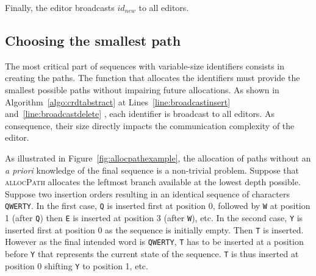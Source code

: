\noindent Finally, the editor broadcasts $id_{new}$ to all editors.


\subsection{Choosing the smallest path}
\label{subsec:choosing}

The most critical part of sequences with variable-size identifiers consists in
creating the paths. The function that allocates the identifiers must provide the
smallest possible paths without impairing future allocations. As shown in
Algorithm~\ref{algo:crdtabstract} at Lines~\ref{line:broadcastinsert}
and~\ref{line:broadcastdelete} , each identifier is broadcast to all editors. As
consequence, their size directly impacts the communication complexity of the
editor.



\begin{figure*}
  \centering
  \hspace{50pt}
  \caption{\label{fig:allocpathexample} Two trees filled with the resulting
    identifiers of two different permutations resulting in an identical sequence
    \texttt{QWERTY}. The function \textsc{allocPath} allocates the leftmost
    branch in the tree. All paths of the optimal case have a length of 1 while
    the tree of the worst case grows up to a depth of 6.}
\end{figure*}

As illustrated in Figure~\ref{fig:allocpathexample}, the allocation of paths
without an \emph{a priori} knowledge of the final sequence is a non-trivial
problem.  Suppose that \textsc{allocPath} allocates the leftmost branch
available at the lowest depth possible. Suppose two insertion orders resulting
in an identical sequence of characters \texttt{QWERTY}.  In the first case,
\texttt{Q} is inserted first at position 0, followed by \texttt{W} at position 1
(after \texttt{Q}) then \texttt{E} is inserted at position 3 (after \texttt{W}),
etc.  In the second case, \texttt{Y} is inserted first at position 0 as the
sequence is initially empty. Then \texttt{T} is inserted. However as the final
intended word is \texttt{QWERTY}, \texttt{T} has to be inserted at a position
before \texttt{Y} that represents the current state of the sequence. \texttt{T}
is thus inserted at position 0 shifting \texttt{Y} to position 1, etc.



